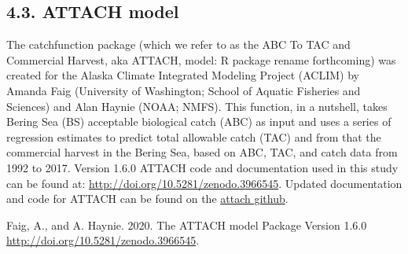 \documentclass[]{article}
\begin{document}
\subsection{4.3. ATTACH model}\label{attach-model}

The catchfunction package (which we refer to as the ABC To TAC and
Commercial Harvest, aka ATTACH, model: R package rename forthcoming) was
created for the Alaska Climate Integrated Modeling Project (ACLIM) by
Amanda Faig (University of Washington; School of Aquatic Fisheries and
Sciences) and Alan Haynie (NOAA; NMFS). This function, in a nutshell,
takes Bering Sea (BS) acceptable biological catch (ABC) as input and
uses a series of regression estimates to predict total allowable catch
(TAC) and from that the commercial harvest in the Bering Sea, based on
ABC, TAC, and catch data from 1992 to 2017. Version 1.6.0 ATTACH code
and documentation used in this study can be found at:
\url{http://doi.org/10.5281/zenodo.3966545}. Updated documentation and
code for ATTACH can be found on the
\href{\%22https://github.com/amandafaig/catchfunction\%22}{attach
github}.

Faig, A., and A. Haynie. 2020. The ATTACH model Package Version 1.6.0
\url{http://doi.org/10.5281/zenodo.3966545}.
\end{document}
